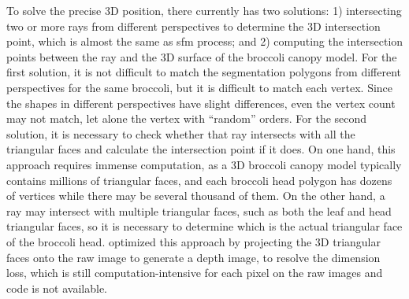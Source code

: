 To solve the precise 3D position, there currently has two solutions: 1) intersecting two or more rays from different perspectives to determine the 3D intersection point, which is almost the same as \gls{sfm} process; and 2) computing the intersection points between the ray and the 3D surface of the broccoli canopy model. For the first solution, it is not difficult to match the segmentation polygons from different perspectives for the same broccoli, but it is difficult to match each vertex. Since the shapes in different perspectives have slight differences, even the vertex count may not match, let alone the vertex with ``random'' orders. For the second solution, it is necessary to check whether that ray intersects with all the triangular faces and calculate the intersection point if it does. On one hand, this approach requires immense computation, as a 3D broccoli canopy model typically contains millions of triangular faces, and each broccoli head polygon has dozens of vertices while there may be several thousand of them. On the other hand, a ray may intersect with multiple triangular faces, such as both the leaf and head triangular faces, so it is necessary to determine which is the actual triangular face of the broccoli head. \citet{shao_cattle_2020} optimized this approach by projecting the 3D triangular faces onto the raw image to generate a depth image, to resolve the dimension loss, which is still computation-intensive for each pixel on the raw images and code is not available. 

